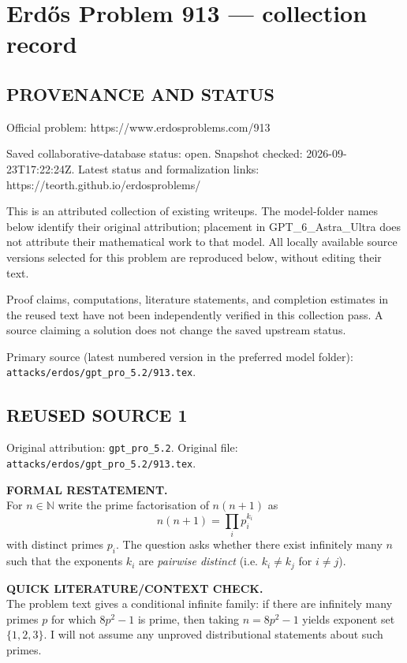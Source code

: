 \section*{Erd\H{o}s Problem 913 --- collection record}

\subsection*{PROVENANCE AND STATUS}
Official problem: https://www.erdosproblems.com/913

Saved collaborative-database status: open.
Snapshot checked: 2026-09-23T17:22:24Z.
Latest status and formalization links: https://teorth.github.io/erdosproblems/

This is an attributed collection of existing writeups. The model-folder names below identify their original attribution; placement in GPT\_6\_Astra\_Ultra does not attribute their mathematical work to that model. All locally available source versions selected for this problem are reproduced below, without editing their text.

Proof claims, computations, literature statements, and completion estimates in the reused text have not been independently verified in this collection pass. A source claiming a solution does not change the saved upstream status.

Primary source (latest numbered version in the preferred model folder): \texttt{attacks/erdos/gpt\_pro\_5.2/913.tex}.

\subsection*{REUSED SOURCE 1}
Original attribution: \texttt{gpt\_pro\_5.2}.
Original file: \texttt{attacks/erdos/gpt\_pro\_5.2/913.tex}.


\noindent\textbf{FORMAL RESTATEMENT.}\\
For $n\in\mathbb{N}$ write the prime factorisation of $n(n+1)$ as
\[
 n(n+1) = \prod_i p_i^{k_i}
\]
with distinct primes $p_i$. The question asks whether there exist infinitely many $n$ such that the exponents $k_i$ are \emph{pairwise distinct} (i.e. $k_i\ne k_j$ for $i\ne j$).

\medskip
\noindent\textbf{QUICK LITERATURE/CONTEXT CHECK.}\\
The problem text gives a conditional infinite family: if there are infinitely many primes $p$ for which $8p^2-1$ is prime, then taking $n=8p^2-1$ yields exponent set $\{1,2,3\}$. I will not assume any unproved distributional statements about such primes.

